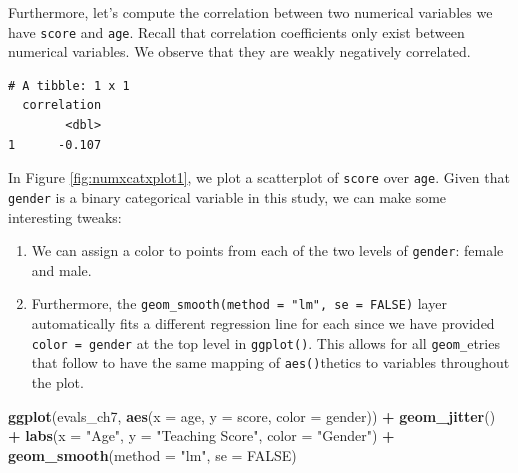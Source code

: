 \documentclass[12pt, krantz2,]{krantz}
\makeatletter
\newenvironment{Shaded}{\begin{snugshade}}{\end{snugshade}}
\newcommand{\DataTypeTok}[1]{\textcolor[rgb]{0.27,0.27,0.27}{#1}}
\newcommand{\KeywordTok}[1]{\textcolor[rgb]{0.27,0.27,0.27}{\textbf{#1}}}
\newcommand{\NormalTok}[1]{#1}
\newcommand{\OperatorTok}[1]{\textcolor[rgb]{0.43,0.43,0.43}{\textbf{#1}}}
\newcommand{\OtherTok}[1]{\textcolor[rgb]{0.37,0.37,0.37}{#1}}
\newcommand{\StringTok}[1]{\textcolor[rgb]{0.5,0.5,0.5}{#1}}
\providecommand{\tightlist}{%
  \setlength{\itemsep}{0pt}\setlength{\parskip}{0pt}}
\newenvironment{kframe}{%
\medskip{}
\setlength{\fboxsep}{.8em}
 \def\at@end@of@kframe{}%
 \ifinner\ifhmode%
  \def\at@end@of@kframe{\end{minipage}}%
  \begin{minipage}{\columnwidth}%
 \fi\fi%
 \def\FrameCommand##1{\hskip\@totalleftmargin \hskip-\fboxsep
 \colorbox{shadecolor}{##1}\hskip-\fboxsep
     \hskip-\linewidth \hskip-\@totalleftmargin \hskip\columnwidth}%
 \MakeFramed {\advance\hsize-\width
   \@totalleftmargin\z@ \linewidth\hsize
   \@setminipage}}%
 {\par\unskip\endMakeFramed%
 \at@end@of@kframe}
\renewenvironment{Shaded}{\begin{kframe}}{\end{kframe}}
\makeatother
\begin{document}
Furthermore, let's compute the correlation between two numerical variables we have \texttt{score} and \texttt{age}. Recall that correlation coefficients only exist between numerical variables. We observe that they are weakly negatively correlated.

\begin{Shaded}
\end{Shaded}

\begin{verbatim}
# A tibble: 1 x 1
  correlation
        <dbl>
1      -0.107
\end{verbatim}

In Figure \ref{fig:numxcatxplot1}, we plot a scatterplot of \texttt{score} over \texttt{age}. Given that \texttt{gender} is a binary categorical variable in this study, we can make some interesting tweaks:

\begin{enumerate}
\def\labelenumi{\arabic{enumi}.}
\tightlist
\item
  We can assign a color to points from each of the two levels of \texttt{gender}: female and male.
\item
  Furthermore, the \texttt{geom\_smooth(method\ =\ "lm",\ se\ =\ FALSE)} layer automatically fits a different regression line for each since we have provided \texttt{color\ =\ gender} at the top level in \texttt{ggplot()}. This allows for all \texttt{geom\_}etries that follow to have the same mapping of \texttt{aes()}thetics to variables throughout the plot.
\end{enumerate}

\begin{Shaded}
\begin{Highlighting}[]
\KeywordTok{ggplot}\NormalTok{(evals_ch7, }\KeywordTok{aes}\NormalTok{(}\DataTypeTok{x =}\NormalTok{ age, }\DataTypeTok{y =}\NormalTok{ score, }\DataTypeTok{color =}\NormalTok{ gender)) }\OperatorTok{+}
\StringTok{  }\KeywordTok{geom_jitter}\NormalTok{() }\OperatorTok{+}
\StringTok{  }\KeywordTok{labs}\NormalTok{(}\DataTypeTok{x =} \StringTok{"Age"}\NormalTok{, }\DataTypeTok{y =} \StringTok{"Teaching Score"}\NormalTok{, }\DataTypeTok{color =} \StringTok{"Gender"}\NormalTok{) }\OperatorTok{+}
\StringTok{  }\KeywordTok{geom_smooth}\NormalTok{(}\DataTypeTok{method =} \StringTok{"lm"}\NormalTok{, }\DataTypeTok{se =} \OtherTok{FALSE}\NormalTok{)}
\end{Highlighting}
\end{Shaded}
\end{document}
